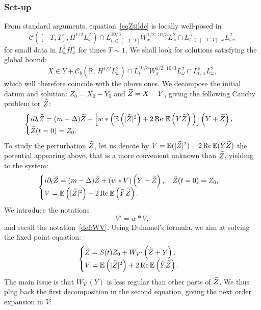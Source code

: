 \documentclass[10pt]{amsart}
\theoremstyle{definition}\newtheorem{defi}[theo]{Definition}\newtheorem{rema}[theo]{Remark}\newtheorem{exam}[theo]{Example}\newtheorem{exem}[theo]{Example}\newtheorem{nota}[theo]{Notation}
\newcommand{\R}{\mathbb{R}}
\newcommand{\E}{\mathbb{E}}
\DeclareMathOperator{\Rel}{Re}
\newcommand{\mclC}{\mathcal{C}}
\let\oldtilde\tilde
\renewcommand*{\tilde}[1]{\mathchoice{\widetilde{#1}}{\widetilde{#1}}{\oldtilde{#1}}{\oldtilde{#1}}}
\begin{document}
\subsubsection{Set-up}
From standard arguments, equation~\eqref{eqZtilde} is locally well-posed in
\begin{equation}\label{LWP}
\mclC\left([-T,T],H^{1/2}L^2_{\omega}\right) \cap L^{10/3}_{t\,\in\, [-T,\,T]}W^{1/2,\,10/3}_xL^2_\omega \cap L^5_{t\,\in\,[-T,\,T],\,x}L^2_\omega,
\end{equation}
for small data in $L^2_\omega H^s_x$ for times $T\sim 1$. We shall look for solutions satisfying the global bound:
\begin{equation} \label{def:spacegwp}
X\in Y + \mclC_b\left(\R,\,H^{1/2}L^2_{\omega}\right) \cap L^{10/3}_{t}W^{1/2,\,10/3}_xL^2_\omega \cap L^5_{t,\,x}L^2_\omega,
\end{equation} which will therefore coincide with the above ones. We decompose the initial datum and solution: $Z_0 = X_0 - Y_0$ and $\tilde Z = X-Y$, giving the following Cauchy problem for $\tilde Z$:
\begin{equation}\label{eqZtilde}
\begin{cases}
i\partial_t \tilde Z =(m -\Delta) \tilde Z +\left[w*\Big(\E\left(|\tilde Z|^2\right)+ 2\Rel\,\E\left(\bar Y \tilde Z\right) \Big)\right] \left(Y+\tilde Z\right), \\
\tilde Z(t=0) = Z_0.
\end{cases}
\end{equation}
To study the perturbation $\tilde Z$, let us denote by $V = \E(|\tilde Z|^2)+ 2\Rel \E(\bar Y \tilde Z)$ the potential appearing above, that is a more convenient unknown than $\tilde Z$, yielding to the system:
\[
\begin{cases}
i\partial_t \tilde Z =(m -\Delta) \tilde Z + (w*V) \left(Y+\tilde Z\right), \quad \tilde Z(t=0) = Z_0, \\
V = \E\left(|\tilde Z|^2\right)+ 2\Rel\E\left(\bar Y \tilde Z\right).
\end{cases}
\]
We introduce the notations
\[
V'=w*V,
\]
and recall the notation~\eqref{def:WV}. Using Duhamel's formula, we aim at solving the fixed point equation:
\[
\begin{cases}
\tilde Z = S(t) Z_0 + W_{V'}\left(\tilde Z+ Y\right),\\
V = \E\left(|\tilde Z|^2\right)+ 2\Rel\E\left(\bar Y \tilde Z\right).
\end{cases}
\]
The main issue is that $W_{V'}(Y)$ is less regular than other parts of $\tilde Z$. We thus plug back the first decomposition in the second equation, giving the next order expansion in $V$:
\end{document}
